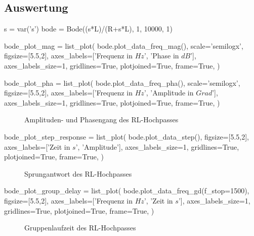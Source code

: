 \subsection{Auswertung}

\begin{sagesilent}
    s = var('s')
    bode = Bode((s*L)/(R+s*L), 1, 10000, 1)

    bode_plot_mag = list_plot(
        bode.plot_data_freq_mag(),
        scale='semilogx',
        figsize=[5.5,2],
        axes_labels=['Frequenz in $Hz$', 'Phase in $dB$'],
        axes_labels_size=1,
        gridlines=True,
        plotjoined=True,
        frame=True,
    )

    bode_plot_pha = list_plot(
        bode.plot_data_freq_pha(),
        scale='semilogx',
        figsize=[5.5,2],
        axes_labels=['Frequenz in $Hz$', 'Amplitude in $Grad$'],
        axes_labels_size=1,
        gridlines=True,
        plotjoined=True,
        frame=True,
    )
\end{sagesilent}

\begin{figure}[H]
    \centering
    \begin{subfigure}{\textwidth}
        \centering
    \end{subfigure}
    \quad
    \begin{subfigure}{\textwidth}
        \centering
    \end{subfigure}
    \caption{Amplituden- und Phasengang des RL-Hochpasses}
\end{figure}

\begin{sagesilent}
    bode_plot_step_response = list_plot(
        bode.plot_data_step(),
        figsize=[5.5,2],
        axes_labels=['Zeit in $s$', 'Amplitude'],
        axes_labels_size=1,
        gridlines=True,
        plotjoined=True,
        frame=True,
    )
\end{sagesilent}

\begin{figure}[H]
    \centering
    \caption{Sprungantwort des RL-Hochpasses}
\end{figure}

\begin{sagesilent}
    bode_plot_group_delay = list_plot(
        bode.plot_data_freq_gd(f_stop=1500),
        figsize=[5.5,2],
        axes_labels=['Frequenz in $Hz$', 'Zeit in $s$'],
        axes_labels_size=1,
        gridlines=True,
        plotjoined=True,
        frame=True,
    )
\end{sagesilent}

\begin{figure}[H]
    \centering
    \caption{Gruppenlaufzeit des RL-Hochpasses}
\end{figure}